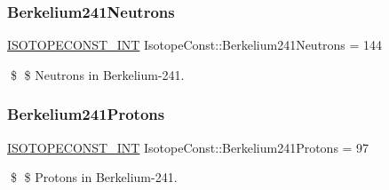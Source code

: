 \subsubsection{\texorpdfstring{Berkelium241\+Neutrons}{Berkelium241Neutrons}}
{\footnotesize\ttfamily \mbox{\hyperlink{group___isotope_const-_macros_ga5f18360b3e99483a35c32d789e62621c}{I\+S\+O\+T\+O\+P\+E\+C\+O\+N\+S\+T\+\_\+\+I\+NT}} Isotope\+Const\+::\+Berkelium241\+Neutrons = 144}

\$ \$ Neutrons in Berkelium-\/241. \mbox{\label{group___isotope_const-_berkelium-_bk241_ga4ef1e8d167494a85236ab2a1f46ca016}} 
\subsubsection{\texorpdfstring{Berkelium241\+Protons}{Berkelium241Protons}}
{\footnotesize\ttfamily \mbox{\hyperlink{group___isotope_const-_macros_ga5f18360b3e99483a35c32d789e62621c}{I\+S\+O\+T\+O\+P\+E\+C\+O\+N\+S\+T\+\_\+\+I\+NT}} Isotope\+Const\+::\+Berkelium241\+Protons = 97}

\$ \$ Protons in Berkelium-\/241. 